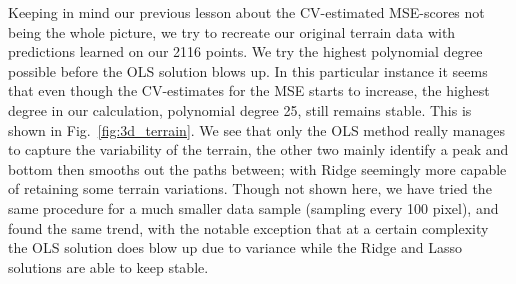 \documentclass[reprint, english, nofootinbib]{revtex4-2}
\begin{document}




Keeping in mind our previous lesson about the CV-estimated MSE-scores not being the whole picture, we try to recreate our original terrain data with predictions learned on our 2116 points. We try the highest polynomial degree possible before the OLS solution blows up. In this particular instance it seems that even though the CV-estimates for the MSE starts to increase, the highest degree in our calculation, polynomial degree 25, still remains stable. This is shown in Fig.~\ref{fig:3d_terrain}. We see that only the OLS method really manages to capture the variability of the terrain, the other two mainly identify a peak and bottom then smooths out the paths between; with Ridge seemingly more capable of retaining some terrain variations. Though not shown here, we have tried the same procedure for a much smaller data sample (sampling every 100 pixel), and found the same trend, with the notable exception that at a certain complexity the OLS solution does blow up due to variance while the Ridge and Lasso solutions are able to keep stable.





\end{document}
